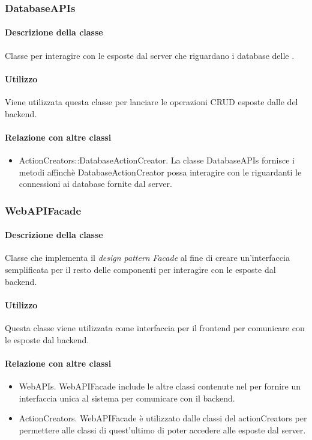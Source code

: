 \subsubsection{DatabaseAPIs}
\paragraph*{Descrizione della classe}
Classe per interagire con le  esposte dal server che riguardano i database delle .

\paragraph*{Utilizzo}
Viene utilizzata questa classe per lanciare le operazioni CRUD esposte dalle  del backend.

\paragraph*{Relazione con altre classi}
\begin{itemize}
\item ActionCreators::DatabaseActionCreator. La classe DatabaseAPIs fornisce i metodi affinchè DatabaseActionCreator possa interagire con le  riguardanti le connessioni ai database fornite dal server.
\end{itemize}

\subsubsection{WebAPIFacade}
\paragraph*{Descrizione della classe}
Classe che implementa il \textit{design pattern} \textit{Facade} al fine di creare un'interfaccia semplificata per il resto delle componenti per interagire con le  esposte dal backend.
\paragraph*{Utilizzo}
Questa classe viene utilizzata come interfaccia per il frontend per comunicare con le  esposte dal backend.
\paragraph*{Relazione con altre classi}
\begin{itemize}
\item WebAPIs. WebAPIFacade include le altre classi contenute nel  per fornire un interfaccia unica al sistema per comunicare con il backend.
\item ActionCreators. WebAPIFacade è utilizzato dalle classi del  actionCreators per permettere alle classi di quest'ultimo di poter accedere alle  esposte dal server. 
\end{itemize} 

